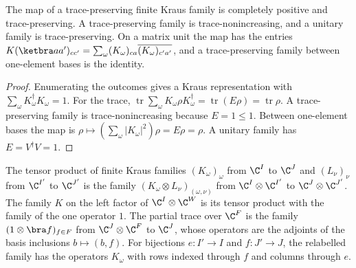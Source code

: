 \begin{lemma}
    \label{lem:kraus_family_channel}
    \leanok
    The map of a trace-preserving finite Kraus family is completely positive and
    trace-preserving. A trace-preserving family is trace-nonincreasing, and a
    unitary family is trace-preserving. On a matrix unit the map has the entries
    $K(\ketbra a{a'})_{cc'}=\sum_\omega(K_\omega)_{ca}\overline{(K_\omega)_{c'a'}}$, and a
    trace-preserving family between one-element bases is the identity.
\end{lemma}
\begin{proof}\leanok
    Enumerating the outcomes gives a Kraus representation with
    $\sum_\omega K_\omega^\dagger K_\omega=1$. For the trace,
    $\operatorname{tr}\sum_\omega K_\omega\rho K_\omega^\dagger
    =\operatorname{tr}(E\rho)=\operatorname{tr}\rho$. A trace-preserving family is
    trace-nonincreasing because $E=1\leq1$. Between one-element bases the map is
    $\rho\mapsto(\sum_\omega\lvert K_\omega\rvert^2)\rho=E\rho=\rho$. A unitary family has
    $E=V^\dagger V=1$.
\end{proof}

\begin{definition}
    \label{def:kraus_family_prod}
    \leanok
    The tensor product of finite Kraus families $(K_\omega)_\omega$ from $\C^I$ to
    $\C^J$ and $(L_\nu)_\nu$ from $\C^{I'}$ to $\C^{J'}$ is the family
    $(K_\omega\otimes L_\nu)_{(\omega,\nu)}$ from $\C^I\otimes\C^{I'}$ to
    $\C^J\otimes\C^{J'}$. The family $K$ on the left factor of $\C^I\otimes\C^W$ is its
    tensor product with the family of the one operator $1$. The partial trace over
    $\C^F$ is the family $(1\otimes\bra f)_{f\in F}$ from $\C^J\otimes\C^F$ to $\C^J$,
    whose operators are the adjoints of the basis inclusions $b\mapsto(b,f)$. For
    bijections $e:I'\to I$ and $f:J'\to J$, the relabelled family has the operators
    $K_\omega$ with rows indexed through $f$ and columns through $e$.
\end{definition}

